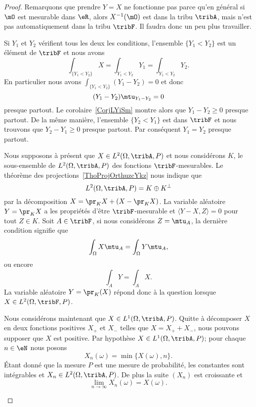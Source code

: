 \begin{proof}
	Remarquons que prendre \( Y=X\) ne fonctionne pas parce qu'en général si \( \mO\) est mesurable dans \( \eR\), alors \( X^{-1}(\mO)\) est dans la tribu \( \tribA\), mais n'est pas automatiquement dans la tribu \( \tribF\). Il faudra donc un peu plus travailler.
	\begin{subproof}
		\spitem[Unicité] Si \( Y_1\) et \( Y_2\) vérifient tous les deux les conditions, l'ensemble \( \{ Y_1<Y_2 \}\) est un élément de \( \tribF\) et nous avons
		\begin{equation}
			\int_{\{ Y_1<Y_2 \}}X=\int_{Y_1<Y_2}Y_1=\int_{Y_1<Y_2}Y_2.
		\end{equation}
		En particulier nous avons \( \int_{\{ Y_1<Y_2 \}}(Y_1-Y_2)=0\) et donc
		\begin{equation}
			(Y_1-Y_2)\mtu_{Y_1-Y_2}=0
		\end{equation}
		presque partout. Le corolaire~\ref{CorjLYiSm} montre alors que \( Y_1-Y_2\geq 0\) presque partout. De la même manière, l'ensemble \( \{ Y_2<Y_1 \}\) est dans \( \tribF\) et nous trouvons que \( Y_2-Y_1\geq 0\) presque partout. Par conséquent \( Y_1=Y_2\) presque partout.

		Nous supposons à présent que \( X\in L^2(\Omega,\tribA,P)\) et nous considérons \( K\), le sous-ensemble de \( L^2(\Omega,\tribA,P)\) des fonctions \( \tribF\)-mesurables. Le théorème des projections~\ref{ThoProjOrthuzcYkz} nous indique que
		\begin{equation}
			L^2(\Omega,\tribA,P)=K\oplus K^{\perp}
		\end{equation}
		par la décomposition \( X=\pr_{K}X+(X-\pr_KX)\). La variable aléatoire \( Y=\pr_KX\) a les propriétés d'être \( \tribF\)-mesurable et \( \langle Y-X, Z\rangle =0\) pour tout \( Z\in K\). Soit \( A\in\tribF\), si nous considérons \( Z=\mtu_A\), la dernière condition signifie que
		\begin{equation}
			\int_{\Omega}X\mtu_A=\int_{\Omega}Y\mtu_A,
		\end{equation}
		ou encore
		\begin{equation}
			\int_AY=\int_AX.
		\end{equation}
		La variable aléatoire \( Y=\pr_K(X)\) répond donc à la question lorsque \( X\in L^2(\Omega,\tribF,P)\).


		Nous considérons maintenant que \( X\in L^1(\Omega,\tribA,P)\). Quitte à décomposer \( X\) en deux fonctions positives \( X_+\) et \( X_-\) telles que \( X=X_++X_-\), nous pouvons supposer que \( X\) est positive. Par hypothèse \( X\in L^1(\Omega,\tribA,P)\); pour chaque \( n\in\eN\) nous posons
		\begin{equation}
			X_n(\omega)=\min\{ X(\omega),n \}.
		\end{equation}
		Étant donné que la mesure \( P\) est une mesure de probabilité, les constantes sont intégrables et \( X_n\in L^2(\Omega,\tribA,P)\). De plus la suite \( (X_n)\) est croissante et
		\begin{equation}
			\lim_{n\to \infty} X_n(\omega)=X(\omega).
		\end{equation}


\end{subproof}
\end{proof}
